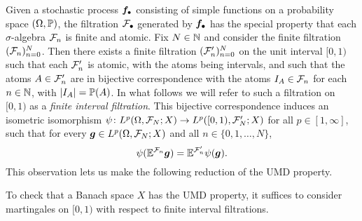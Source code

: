 Given a stochastic process $\mb{f}_{\bullet}$ consisting of simple functions on a probability space $(\Omega,\P)$, the filtration $\mc{F}_{\bullet}$ generated by $\mb{f}_{\bullet}$ has the special property that each $\sigma$-algebra $\mc{F}_{n}$ is finite and atomic.
Fix $N \in \N$ and consider the finite filtration $(\mc{F}_{n})_{n=0}^{N}$.
Then there exists a finite filtration $(\mc{F}_{n}')_{n=0}^{N}$ on the unit interval $[0,1)$ such that each $\mc{F}_{n}'$ is atomic, with the atoms being intervals, and such that the atoms $A \in \mc{F}_{n}'$ are in bijective correspondence with the atoms $I_{A} \in \mc{F}_{n}$ for each $n \in \N$, with $|I_{A}| = \P(A)$.
In what follows we will refer to such a filtration on $[0,1)$ as a \emph{finite interval filtration}.
This bijective correspondence induces an isometric isomorphism $\psi \colon L^p(\Omega,\mc{F}_{N};X) \to L^p([0,1),\mc{F}_{N}';X)$ for all $p \in [1,\infty]$, such that for every $\mb{g} \in L^p(\Omega, \mc{F}_{N};X)$ and all $n \in \{0,1,\ldots,N\}$,
\begin{equation*}
  \psi(\E^{\mc{F}_{n}} \mb{g}) = \E^{\mc{F}_{n}'} \psi(\mb{g}). 
\end{equation*}
This observation lets us make the following reduction of the UMD property.

\begin{prop}\label{prop:UMD-FIF}
  To check that a Banach space $X$ has the UMD property, it suffices to consider martingales on $[0,1)$ with respect to finite interval filtrations.
\end{prop}

